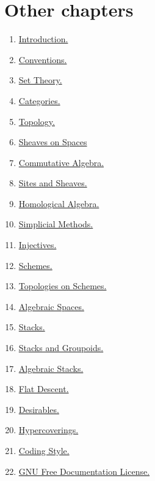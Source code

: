 \section{Other chapters}

\begin{multicols}{2}
\begin{enumerate}
\item \hyperref[introduction-section-overview]{Introduction.}
\item \hyperref[conventions-section-comments]{Conventions.}
\item \hyperref[sets-section-introduction]{Set Theory.}
\item \hyperref[categories-section-introduction]{Categories.}
\item \hyperref[topology-section-introduction]{Topology.}
\item \hyperref[sheaves-section-introduction]{Sheaves on Spaces}
\item \hyperref[algebra-section-introduction]{Commutative Algebra.}
\item \hyperref[sites-section-introduction]{Sites and Sheaves.}
\item \hyperref[homology-section-introduction]{Homological Algebra.}
\item \hyperref[simplicial-section-introduction]{Simplicial Methods.}
\item \hyperref[injectives-section-introduction]{Injectives.}
\item \hyperref[schemes-section-introduction]{Schemes.}
\item \hyperref[etale-section-introduction]{Topologies on Schemes.}
\item \hyperref[spaces-section-introduction]{Algebraic Spaces.}
\item \hyperref[stacks-section-introduction]{Stacks.}
\item \hyperref[stacks-groupoids-section-introduction]{Stacks and Groupoids.}
\item \hyperref[algebraic-section-introduction]{Algebraic Stacks.}
\item \hyperref[flat-section-introduction]{Flat Descent.}
\item \hyperref[desirables-section-introduction]{Desirables.}
\item \hyperref[hypercovering-section-introduction]{Hypercoverings.}
\item \hyperref[coding-section-style]{Coding Style.}
\item \hyperref[fdl-version]{GNU Free Documentation License.}
\end{enumerate}
\end{multicols}
